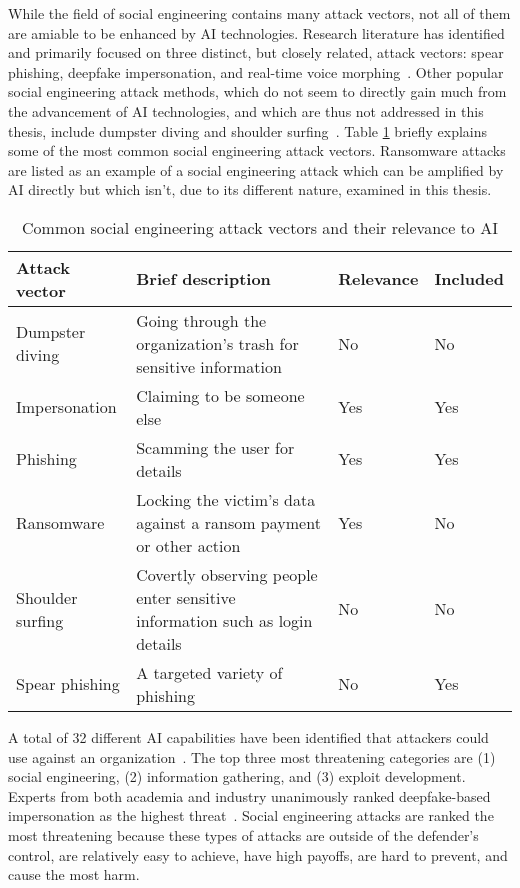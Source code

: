 %
%
While the field of social engineering contains many attack vectors, not all of them are amiable to be enhanced by AI technologies. Research literature has identified and primarily focused on three distinct, but closely related, attack vectors: spear phishing, deepfake impersonation, and real-time voice morphing~\citep{king_AI_Crime_Interdisciplinary_Analysis_2019}. Other popular social engineering attack methods, which do not seem to directly gain much from the advancement of AI technologies, and which are thus not addressed in this thesis, include dumpster diving and shoulder surfing~\citep{mirsky_Threat_Offensive_AI_Organizations_2023}. Table \ref{table:attacks} briefly explains some of the most common social engineering attack vectors. Ransomware attacks are listed as an example of a social engineering attack which can be amplified by AI directly but which isn’t, due to its different nature, examined in this thesis.

\begin{table}[h!]  
\centering  
\renewcommand{\arraystretch}{1.5} %
\setlength{\tabcolsep}{5pt} %
\begin{tabularx}{\textwidth}{|l|X|l|l|} %
\hline  
\textbf{Attack vector} & \textbf{Brief description} & \textbf{Relevance} & \textbf{Included} \\ \hline  
Dumpster diving & Going through the organization's trash for sensitive information & No & No \\ \hline  
Impersonation & Claiming to be someone else & Yes & Yes \\ \hline  
Phishing & Scamming the user for details & Yes & Yes \\ \hline  
Ransomware & Locking the victim's data against a ransom payment or other action & Yes & No \\ \hline  
Shoulder surfing & Covertly observing people enter sensitive information such as login details & No & No \\ \hline  
Spear phishing & A targeted variety of phishing & No & Yes \\ \hline  
\end{tabularx}  
\caption{Common social engineering attack vectors and their relevance to AI}  
\label{table:attacks}  
\end{table} 


%
%
A total of 32 different AI capabilities have been identified that attackers could use against an organization~\citep{mirsky_Threat_Offensive_AI_Organizations_2023}. The top three most threatening categories are (1) social engineering, (2) information gathering, and (3) exploit development. Experts from both academia and industry unanimously ranked deepfake-based impersonation as the highest threat~\citep{mirsky_Threat_Offensive_AI_Organizations_2023}. Social engineering attacks are ranked the most threatening because these types of attacks are outside of the defender's control, are relatively easy to achieve, have high payoffs, are hard to prevent, and cause the most harm.



